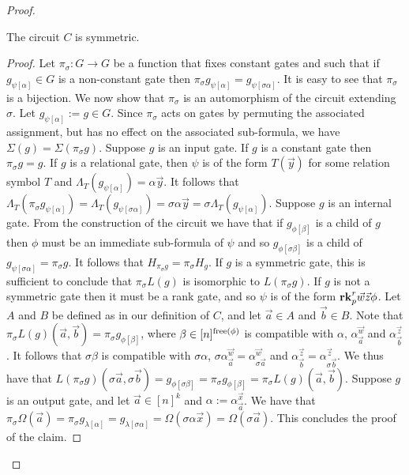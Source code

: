 \documentclass[../paper.tex]{subfiles}
\begin{document}
\begin{proof}
\begin{claim}
  The circuit $C$ is symmetric.
\end{claim}
\begin{proof}
  Let $\pi_\sigma : G \rightarrow G$ be a function that fixes constant gates and
  such that if $g_{\psi[\alpha]} \in G$ is a non-constant gate then
  $\pi_{\sigma} g_{\psi [\alpha]} = g_{\psi[\sigma \alpha]}$. It is easy to see
  that $\pi_\sigma$ is a bijection. We now show that $\pi_{\sigma}$ is an
  automorphism of the circuit extending $\sigma$. Let $g_{\psi[\alpha]} := g \in
  G$. Since $\pi_{\sigma}$ acts on gates by permuting the associated assignment,
  but has no effect on the associated sub-formula, we have $\Sigma(g) = \Sigma
  (\pi_{\sigma} g)$. Suppose $g$ is an input gate. If $g$ is a constant gate
  then $\pi_\sigma g = g$. If $g$ is a relational gate, then $\psi$ is of the
  form $T(\vec{y})$ for some relation symbol $T$ and $\Lambda_T
  (g_{\psi[\alpha]}) = \alpha \vec{y}$. It follows that $\Lambda_T (\pi_{\sigma}
  g_{\psi[\alpha]}) = \Lambda_T( g_{\psi[\sigma \alpha]}) = \sigma \alpha
  \vec{y} = \sigma \Lambda_T (g_{\psi[\alpha]})$. Suppose $g$ is an internal
  gate. From the construction of the circuit we have that if $g_{\phi[\beta]}$
  is a child of $g$ then $\phi$ must be an immediate sub-formula of $\psi$ and
  so $g_{\phi[\sigma \beta]}$ is a child of $g_{\psi[\sigma \alpha]} =
  \pi_{\sigma} g$. It follows that $H_{\pi_\sigma g} = \pi_\sigma H_g$. If $g$
  is a symmetric gate, this is sufficient to conclude that $\pi_{\sigma} L(g)$
  is isomorphic to $L(\pi_{\sigma} g)$. If $g$ is not a symmetric
  gate then it must be a rank gate, and so $\psi$ is of the form $\text{\textbf{rk}}^r_p
  \vec{w} \vec{z} \phi$. Let $A$ and $B$ be defined as in our definition of $C$,
  and let $\vec{a} \in A$ and $\vec{b} \in B$. Note that $\pi_\sigma L(g)
  (\vec{a}, \vec{b}) = \pi_{\sigma} g_{\phi[\beta]}$, where $\beta \in
  [n]^{\mathrm{free}(\phi)}$ is compatible with $\alpha$, $\alpha^{\vec{w}}_{\vec{a}}$
  and $\alpha^{\vec{z}}_{\vec{b}}$. It follows that $\sigma \beta$ is compatible
  with $\sigma \alpha$, $\sigma \alpha^{\vec{w}}_{\vec{a}} =
  \alpha^{\vec{w}}_{\sigma \vec{a}}$ and $\alpha^{\vec{z}}_{\vec{b}} =
  \alpha^{\vec{z}}_{\sigma \vec{b}}$. We thus have that $L(\pi_{\sigma}
  g)(\sigma \vec{a}, \sigma \vec{b}) = g_{\phi[\sigma \beta]} = \pi_{\sigma}
  g_{\phi[\beta]} = \pi_{\sigma} L(g)(\vec{a}, \vec{b})$. Suppose $g$ is an
  output gate, and let $\vec{a} \in [n]^k$ and $\alpha :=
  \alpha^{\vec{x}}_{\vec{a}}$. We have that $\pi_{\sigma} \Omega (\vec{a}) =
  \pi_\sigma g_{\lambda[\alpha]} = g_{\lambda[\sigma \alpha]} = \Omega (\sigma
  \alpha \vec{x}) = \Omega (\sigma \vec{a})$. This concludes the proof of the
  claim.
\end{proof}
  

\end{proof}
\end{document}
